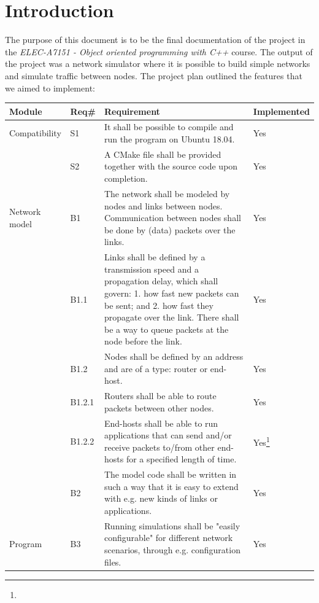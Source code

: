 \newpage 
\tableofcontents

\newpage
\section{Introduction} 

The purpose of this document is to be the final documentation of the project in the \textit{ELEC-A7151 - Object oriented programming with C++} course. The output of the project was a network simulator  where it is possible to build simple networks and simulate traffic between nodes. The project plan outlined the features that we aimed to implement:

\begin{table}[!htbp]
\footnotesize{
\begin{tabular}{p{}|p{}|p{}|p{}}
\textbf{Module} & \textbf{Req\#} & \textbf{Requirement} & \textbf{Implemented} \\
\hline Compatibility
& S1        & It shall be possible to compile and run the program on Ubuntu 18.04. & Yes\\
& S2        & A CMake file shall be provided together with the source code upon completion. & Yes\\
\hline Network model   
& B1        & The network shall be modeled by nodes and links between nodes. Communication between nodes shall be done by (data) packets over the links.  & Yes \\
& B1.1      & Links shall be defined by a transmission speed and a propagation delay, which shall govern: 1. how fast new packets can be sent; and 2. how fast they propagate over the link. There shall be a way to queue packets at the node before the link. & Yes \\
& B1.2      & Nodes shall be defined by an address and are of a type: router or end-host. & Yes\\
& B1.2.1    & Routers shall be able to route packets between other nodes. & Yes\\
& B1.2.2    & End-hosts shall be able to run applications that can send and/or receive packets to/from other end-hosts for a specified length of time. & Yes\footnote{}\\
& B2        & The model code shall be written in such a way that it is easy to extend with e.g. new kinds of links or applications. & Yes\\ 
\hline Program
& B3        & Running simulations shall be "easily configurable" for different network scenarios, through e.g. configuration files. & Yes\\

\end{tabular}}
\end{table}
